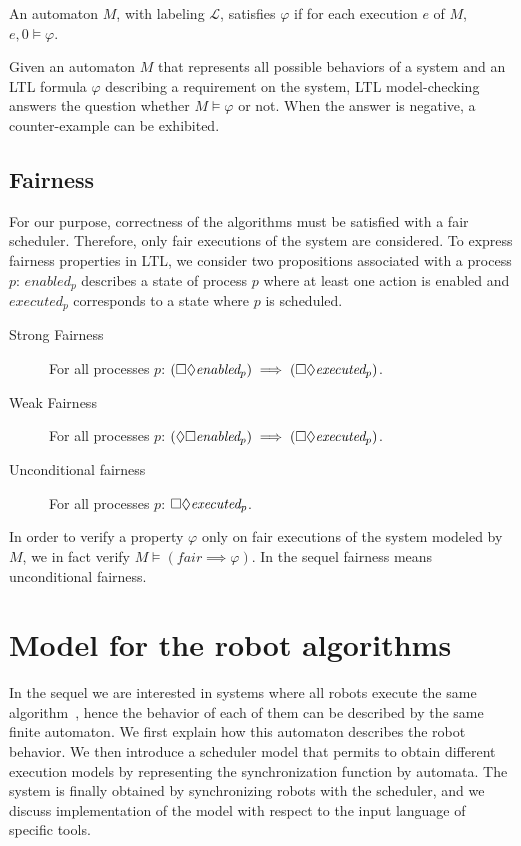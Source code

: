 \begin{definition} An automaton $M$, with labeling $\mathcal{L}$,
  satisfies $\varphi$ if for each execution $e$ of $M$, $e, 0 \vDash
  \varphi$.
\end{definition}

Given an automaton $M$ that represents all possible behaviors of a
system and an \textsf{LTL} formula $\varphi$ describing a requirement
on the system, \textsf{LTL} model-checking answers the question
whether $M \models \varphi$ or not.
When the answer is negative, a counter-example can be exhibited.

\subsection{Fairness}
For our purpose, correctness of the algorithms must be satisfied with a fair scheduler.
Therefore, only fair executions of the system are considered. To express fairness properties in \textsf{LTL},
we consider two propositions associated with a process $p$: $\textit{enabled}_p$ describes a state of process $p$ 
where at least one action is enabled and $\textit{executed}_p$ corresponds to a state where $p$ is scheduled. 
\begin{description}
\item [Strong Fairness]
For all processes $p$: $(\Box\Diamond \textit{enabled}_p) \implies (\Box\Diamond \textit{executed}_p)$.
\item[Weak Fairness]
For all processes $p$: $(\Diamond\Box\textit{enabled}_p) \implies (\Box\Diamond\textit{executed}_p)$.
\item[Unconditional fairness]
For all processes $p$: $\Box\Diamond\textit{executed}_p$.
\end{description}
In order to verify a property $\varphi$ only on fair executions of the system
modeled by $M$, we in fact verify $M \models (\textit{fair} \implies \varphi)$.
In the sequel fairness means unconditional fairness.


\section{Model for the robot algorithms}
In the sequel we are interested in systems where 
all robots execute the same algorithm~\cite{FPS12}, hence the
 behavior of each of them can be described by the same finite automaton. 
We first explain how this automaton describes the robot behavior. We then 
 introduce a scheduler model that permits to obtain different execution models
 by representing the synchronization function by automata. The system is finally 
 obtained by synchronizing robots with the scheduler, and we discuss 
 implementation of the model with respect to  the input language of specific tools.
 
